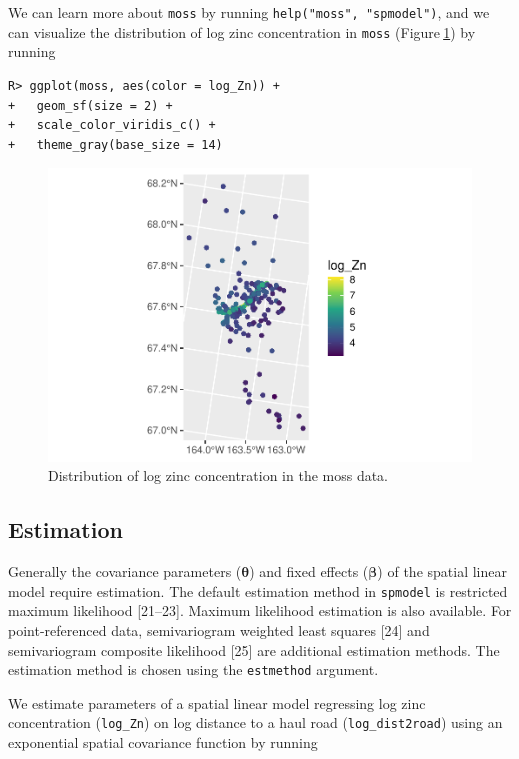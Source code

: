 \documentclass[10pt,letterpaper]{article}
\begin{document}
We can learn more about \texttt{moss} by running
\texttt{help("moss",\ "spmodel")}, and we can visualize the distribution
of log zinc concentration in \texttt{moss} (Figure\(~\)\ref{fig:log_zn})
by running

\begin{verbatim}
R> ggplot(moss, aes(color = log_Zn)) +
+   geom_sf(size = 2) +
+   scale_color_viridis_c() +
+   theme_gray(base_size = 14)
\end{verbatim}

\begin{figure}

{\centering \includegraphics[width=0.65\linewidth]{preprint_old_files/figure-latex/log_zn-1} 

}

\caption{Distribution of log zinc concentration in the moss data.}\label{fig:log_zn}
\end{figure}

\hypertarget{estimation}{%
\subsection{Estimation}\label{estimation}}

Generally the covariance parameters (\(\boldsymbol{\theta}\)) and fixed
effects (\(\boldsymbol{\beta}\)) of the spatial linear model require
estimation. The default estimation method in \texttt{spmodel} is
restricted maximum likelihood {[}21--23{]}. Maximum likelihood
estimation is also available. For point-referenced data, semivariogram
weighted least squares {[}24{]} and semivariogram composite likelihood
{[}25{]} are additional estimation methods. The estimation method is
chosen using the \texttt{estmethod} argument.

We estimate parameters of a spatial linear model regressing log zinc
concentration (\texttt{log\_Zn}) on log distance to a haul road
(\texttt{log\_dist2road}) using an exponential spatial covariance
function by running
\end{document}
